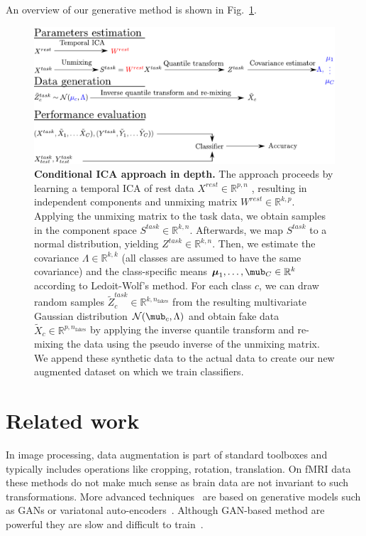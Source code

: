An overview of our generative method is shown in Fig.~\ref{Fig11}.
%
\begin{figure}
\centerline{\includegraphics[width=1\textwidth]{figures/condica/method_figure}}
\caption{\textbf{Conditional ICA approach in depth.} 
The approach proceeds by learning a temporal ICA of rest data $X^{rest} \in
\mathbb{R}^{p, n}$ , resulting in
independent components and unmixing matrix $W^{rest} \in \mathbb{R}^{k, p}$.
%
Applying the unmixing matrix to the task data, we obtain samples in the component
space $S^{task} \in \mathbb{R}^{k, n}$.
%
Afterwards, we map $S^{task}$ to a normal distribution, yielding $Z^{task} \in
\mathbb{R}^{k, n}$. 
%
Then, we estimate the covariance $\Lambda \in \mathbb{R}^{k, k}$ (all classes are assumed to have the
same covariance) and the class-specific means $\boldsymbol{\mu}_1, \dots, \mub_C \in \mathbb{R}^{k}$ according to Ledoit-Wolf's method.
%
For each class $c$, we can draw random samples $\tilde{Z}^{task}_c \in
\mathbb{R}^{k, n_{\mathrm{fakes}}}$ from the
resulting multivariate Gaussian distribution $\mathcal{N}(\mub_c, \Lambda)$ and
obtain fake data $\tilde{X}_c  \in
\mathbb{R}^{p, n_{\mathrm{fakes}}}$
by applying the inverse quantile transform and re-mixing the data using the pseudo inverse of the unmixing matrix.
%
We append these synthetic data to the actual data to create our new augmented
dataset on which we train classifiers.}
\label{Fig11}
\end{figure}
%

\section{Related work}
In image processing, data augmentation is part of standard toolboxes and
typically includes operations like cropping, rotation, translation.
%
On fMRI data these methods do not make much sense as brain data are not invariant to such transformations.
%
More advanced techniques~\cite{zhuang2019fmri} %
are based on generative models such as GANs or variatonal
auto-encoders~\cite{kingma2013auto}. Although GAN-based method are powerful they are slow and difficult to train~\cite{arjovsky_wasserstein_2017}.

